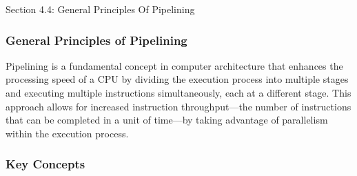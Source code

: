 \begin{notes}{Section 4.4: General Principles Of Pipelining}
    \subsubsection*{General Principles of Pipelining}

    Pipelining is a fundamental concept in computer architecture that enhances the processing speed of a CPU by dividing the execution process into multiple stages and executing multiple instructions 
    simultaneously, each at a different stage. This approach allows for increased instruction throughput—the number of instructions that can be completed in a unit of time—by taking advantage of parallelism 
    within the execution process. \vspace*{1em}
    
    \subsubsection*{Key Concepts}
    

\end{notes}
